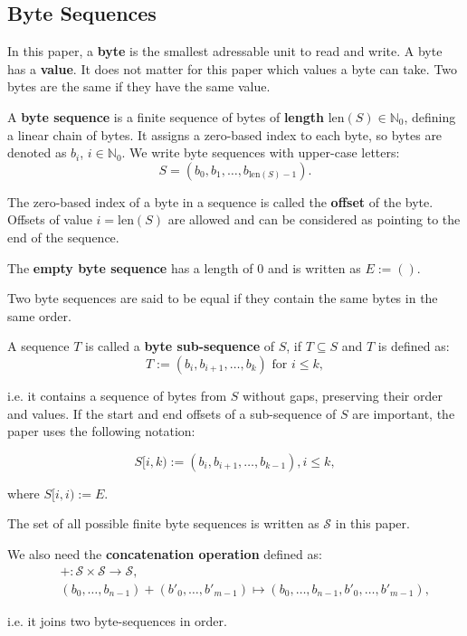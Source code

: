 \documentclass[english, 10pt, openright, twocolumn, landscape, twoside, notitlepage, a4paper, pdftex]		
{article}
\begin{document}
\subsection{Byte Sequences}%
\label{sec:ByteSequences}%

In this paper, a \textbf{byte} is the smallest adressable unit to read and write. A byte has a \textbf{value}. It does not matter for this paper which values a byte can take. Two bytes are the same if they have the same value.

A \textbf{byte sequence} is a finite sequence of bytes of \textbf{length} $\text{len}(S)\in\mathbb{N}_{0}$, defining a linear chain of bytes. It assigns a zero-based index to each byte, so bytes are denoted as $b_{i}$, $i\in\mathbb{N}_{0}$. We write byte sequences with upper-case letters:
\[S=(b_{0}, b_{1}, \ldots, b_{\text{len}(S)-1}).\]

The zero-based index of a byte in a sequence is called the \textbf{offset} of the byte. Offsets of value $i=\text{len}(S)$ are allowed and can be considered as pointing to the end of the sequence.

The \textbf{empty byte sequence} has a length of 0 and is written as $E:=()$.

Two byte sequences are said to be equal if they contain the same bytes in the same order.

A sequence $T$ is called a \textbf{byte sub-sequence} of $S$, if $T\subseteq S$ and $T$ is defined as:
\[T:=(b_{i}, b_{i+1}, \ldots, b_{k})\text{ for }i\leq k,\]

i.e. it contains a sequence of bytes from $S$ without gaps, preserving their order and values. If the start and end offsets of a sub-sequence of $S$ are important, the paper uses the following notation:

\[S[i, k):=(b_{i}, b_{i+1}, \ldots, b_{k-1}),i\leq k,\]

where $S[i, i):=E.$

The set of all possible finite byte sequences is written as $\mathcal{S}$ in this paper.

We also need the \textbf{concatenation operation} defined as:
\begin{eqnarray*}
  &&+:\mathcal{S}\times \mathcal{S} \rightarrow \mathcal{S}, \\
&&(b_{0},\ldots,b_{n-1})+(b'_{0},\ldots,b'_{m-1}) \mapsto (b_{0},\ldots,b_{n-1}, b'_{0},\ldots,b'_{m-1}),
\end{eqnarray*}

i.e. it joins two byte-sequences in order.
\end{document}
